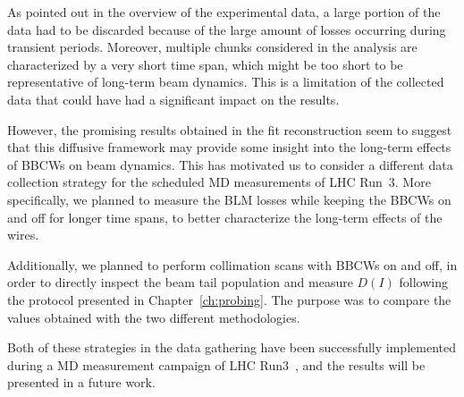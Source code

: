As pointed out in the overview of the experimental data, a large portion of the data had to be discarded because of the large amount of losses occurring during transient periods. Moreover, multiple chunks considered in the analysis are characterized by a very short time span, which might be too short to be representative of long-term beam dynamics. This is a limitation of the collected data that could have had a significant impact on the results.

However, the promising results obtained in the fit reconstruction seem to suggest that this diffusive framework may provide some insight into the long-term effects of BBCWs on beam dynamics. This has motivated us to consider a different data collection strategy for the scheduled MD measurements of LHC Run~3. More specifically, we planned to measure the BLM losses while keeping the BBCWs on and off for longer time spans, to better characterize the long-term effects of the wires.

Additionally, we planned to perform collimation scans with BBCWs on and off, in order to directly inspect the beam tail population and measure $D(I)$ following the protocol presented in Chapter~\ref{ch:probing}. The purpose was to compare the values obtained with the two different methodologies.

Both of these strategies in the data gathering have been successfully implemented during a MD measurement campaign of LHC Run3~\cite{}, and the results will be presented in a future work.